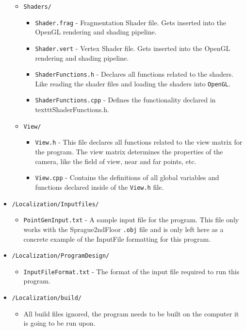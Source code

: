 \documentclass[a4paper,11pt]{article}
\begin{document}
\begin{itemize}
\begin{itemize}
            \item \texttt{Shaders/}
                \begin{itemize}
                \item \texttt{Shader.frag} - Fragmentation Shader file. Gets inserted into the OpenGL rendering and shading pipeline. 
                \item \texttt{Shader.vert} - Vertex Shader file. Gets inserted into the OpenGL rendering and shading pipeline.
                \item \texttt{ShaderFunctions.h} - Declares all functions related to the shaders. Like reading the shader files and loading the shaders into \texttt{OpenGL}.
                \item \texttt{ShaderFunctions.cpp} - Defines the functionality declared in texttt{ShaderFunctions.h}.
                \end{itemize}
            \item \texttt{View/}
                \begin{itemize}
                \item \texttt{View.h} - This file declares all functions related to the view matrix for the program. The view matrix determines the properties of the camera, like the field of view, near and far points, etc.
                \item \texttt{View.cpp} - Contains the definitions of all global variables and functions declared inside of the \texttt{View.h} file. 
                \end{itemize}
            \end{itemize}%
        \item \texttt{/Localization/Inputfiles/}
	    \begin{itemize} 
            \item \texttt{PointGenInput.txt} - A sample input file for the program. This file only works with the Sprague2ndFloor \texttt{.obj} file and is only left here as a concrete example of the InputFile formatting for this program.
            \end{itemize}
        \item \texttt{/Localization/ProgramDesign/}
            \begin{itemize}
            \item \texttt{InputFileFormat.txt} - The format of the input file required to run this program.
            \end{itemize}
        \item \texttt{/Localization/build/}
	    \begin{itemize}
	    \item All build files ignored, the program needs to be built on the computer it is going to be run upon.
	    \end{itemize}
        \end{itemize} %
        
\end{document}
